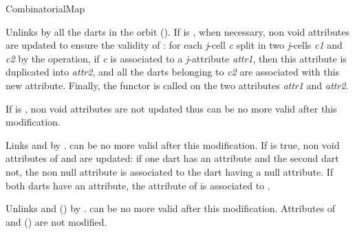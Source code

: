 \begin{ccRefConcept}{CombinatorialMap}
 {Unlinks by \betai{} all the darts in the
  orbit
  \orbit{\betaun{},\myldots{},\betaimdeux{},\betaipdeux{},\myldots{},\betad{}}().  If
   is , when necessary, non void
  attributes are updated to ensure the validity of : for each
  \emph{j}-cell \emph{c} split in two \emph{j}-cells \emph{c1} and \emph{c2} by the
  operation, if \emph{c} is associated to a \emph{j}-attribute \emph{attr1}, then
  this attribute is duplicated into \emph{attr2}, and all the darts
  belonging to \emph{c2} are associated with this new attribute.  Finally,
  the functor  is called on the
  two attributes \emph{attr1} and \emph{attr2}.
\begin{ccAdvanced}
  If  is , non void attributes are
  not updated thus  can be no more valid after this
  modification. 
\end{ccAdvanced}}

\begin{ccAdvanced}

{Links  and   by \betai{}. 
   can be no more valid after this modification.  If
   is true, non void attributes of  and
   are updated: if one dart has an attribute and the second
  dart not, the non null attribute is associated to the dart having a null attribute. 
  If both darts have an attribute, 
  the attribute of  is associated to .
  }


  {Unlinks  and \betai{}() by \betai{}.
     can be no more valid after this modification. 
    Attributes of  and \betai{}()
    are not modified.
    }

\end{ccAdvanced}


\end{ccRefConcept}
